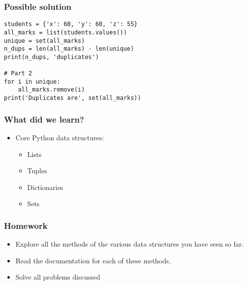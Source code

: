 \documentclass[14pt,compress]{beamer}
\begin{document}
\begin{frame}[fragile]
  \frametitle{Possible solution}
\begin{lstlisting}
students = {'x': 60, 'y': 60, 'z': 55}
all_marks = list(students.values())
unique = set(all_marks)
n_dups = len(all_marks) - len(unique)
print(n_dups, 'duplicates')

# Part 2
for i in unique:
    all_marks.remove(i)
print('Duplicates are', set(all_marks))
\end{lstlisting}
\end{frame}

\begin{frame}
  \frametitle{What did we learn?}
  \begin{itemize}
    \item Core Python data structures:
    \begin{itemize}
      \item Lists
      \item Tuples
      \item Dictionaries
      \item Sets
    \end{itemize}
  \end{itemize}
\end{frame}

\begin{frame}
  \frametitle{Homework}

  \begin{itemize}
  \item Explore all the methods of the various data structures you have seen
    so far.
  \item Read the documentation for each of these methods.
  \item Solve all problems discussed
  \end{itemize}
\end{frame}
\end{document}
